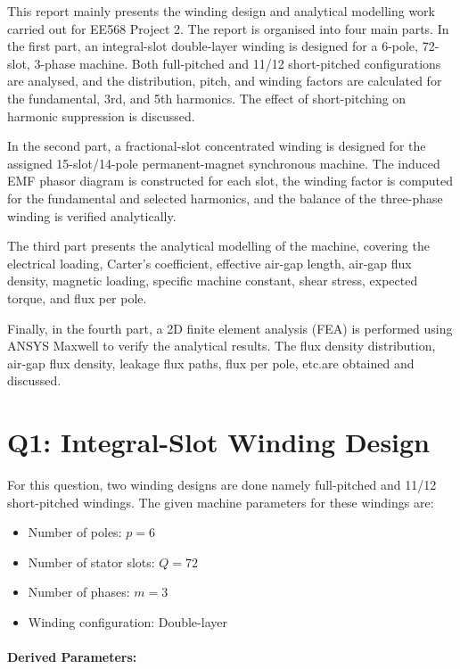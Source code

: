 \documentclass[12pt, a4paper]{article}
\begin{document}
This report mainly presents the winding design and analytical modelling work carried out for EE568 Project 2. The report is organised into four main parts. In the first part, an integral-slot double-layer winding is designed for a 6-pole, 72-slot, 3-phase machine. Both full-pitched and 11/12 short-pitched configurations are analysed, and the distribution, pitch, and winding factors are calculated for the fundamental, 3rd, and 5th harmonics. The effect of short-pitching on harmonic suppression is discussed.

In the second part, a fractional-slot concentrated winding is designed for the assigned 15-slot/14-pole permanent-magnet synchronous machine. The induced EMF phasor diagram is constructed for each slot, the winding factor is computed for the fundamental and selected harmonics, and the balance of the three-phase winding is verified analytically.

The third part presents the analytical modelling of the machine, covering the electrical loading, Carter's coefficient, effective air-gap length, air-gap flux density, magnetic loading, specific machine constant, shear stress, expected
torque, and flux per pole.

Finally, in the fourth part, a 2D finite element analysis (FEA) is performed using ANSYS Maxwell to verify the analytical results. The flux density distribution, air-gap flux density, leakage flux paths, flux per pole, etc.are obtained and discussed.



\section{Q1: Integral-Slot Winding Design}

For this question, two winding designs are done namely full-pitched and 11/12 short-pitched windings. The given machine parameters for these windings are:

\begin{itemize}
    \item Number of poles: $p = 6$ 
    \item Number of stator slots: $Q = 72$
    \item Number of phases: $m = 3$
    \item Winding configuration: Double-layer
\end{itemize}

\paragraph{Derived Parameters:}
\end{document}
